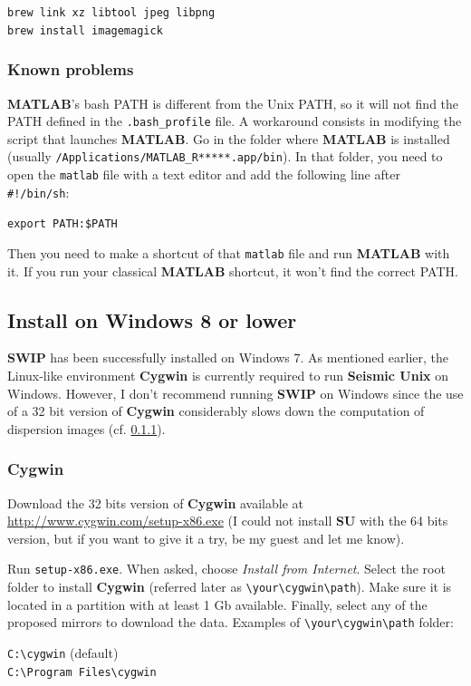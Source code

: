\documentclass[twoside,a4paper]{article}
\def\SWIP{\textbf{SWIP}}
\def\SU{\textbf{SU}}
\def\SeismicUnix{\textbf{Seismic Unix}}
\def\MATLAB{\textbf{MATLAB}}
\def\Cygwin{\textbf{Cygwin}}
\begin{document}
\verb|brew link xz libtool jpeg libpng|\\
\verb|brew install imagemagick|

\subsubsection{Known problems}
{\MATLAB}'s bash PATH is different from the Unix PATH, so it will not find the PATH defined in the \verb|.bash_profile| file. A workaround consists in modifying the script that launches {\MATLAB}. Go in the folder where {\MATLAB} is installed (usually \verb|/Applications/MATLAB_R*****.app/bin|). In that folder, you need to open the \verb|matlab| file with a text editor and add the following line after \verb|#!/bin/sh|:

\verb|export PATH:$PATH|

Then you need to make a shortcut of that \verb|matlab| file and run {\MATLAB} with it. If you run your classical {\MATLAB} shortcut, it won't find the correct PATH.

\clearpage
\subsection{Install on Windows 8 or lower}
{\SWIP} has been successfully installed on Windows 7. As mentioned earlier, the Linux-like environment {\Cygwin} is currently required to run {\SeismicUnix} on Windows. However, I don't recommend running {\SWIP} on Windows since the use of a 32 bit version of {\Cygwin} considerably slows down the computation of dispersion images (cf. \ref{sec:cygwin}).

\subsubsection{Cygwin}
\label{sec:cygwin}
Download the 32 bits version of {\Cygwin} available at \url{http://www.cygwin.com/setup-x86.exe} (I could not install {\SU} with the 64 bits version, but if you want to give it a try, be my guest and let me know).

Run \verb|setup-x86.exe|. When asked, choose \textit{Install from Internet}. Select the root folder to install {\Cygwin} (referred later as \verb|\your\cygwin\path|). Make sure it is located in a partition with at least 1 Gb available. Finally, select any of the proposed mirrors to download the data.
Examples of \verb|\your\cygwin\path| folder:

\verb|C:\cygwin| (default)\\
\verb|C:\Program Files\cygwin|
\end{document}
